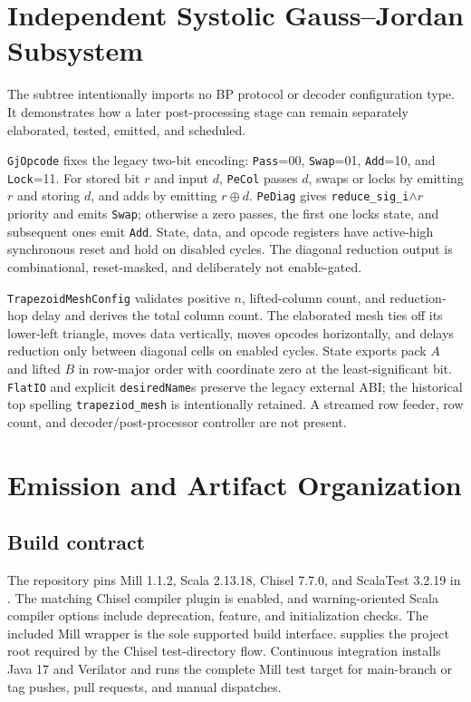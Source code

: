 \documentclass[10pt,conference]{IEEEtran}
\begin{document}
\section{Independent Systolic Gauss--Jordan Subsystem}
The  subtree intentionally imports no BP protocol or decoder
configuration type.  It demonstrates how a later post-processing stage can
remain separately elaborated, tested, emitted, and scheduled.

\texttt{GjOpcode} fixes the legacy two-bit encoding:
\texttt{Pass}=00, \texttt{Swap}=01, \texttt{Add}=10, and
\texttt{Lock}=11.  For stored bit $r$ and input $d$, \texttt{PeCol} passes $d$,
swaps or locks by emitting $r$ and storing $d$, and adds by emitting
$r\oplus d$.  \texttt{PeDiag} gives
\texttt{reduce\_sig\_i}$\land r$ priority and emits \texttt{Swap}; otherwise a
zero passes, the first one locks state, and subsequent ones emit
\texttt{Add}.  State, data, and opcode registers have active-high synchronous
reset and hold on disabled cycles.  The diagonal reduction output is
combinational, reset-masked, and deliberately not enable-gated.

\texttt{TrapezoidMeshConfig} validates positive $n$, lifted-column count, and
reduction-hop delay and derives the total column count.  The elaborated mesh
ties off its lower-left triangle, moves data vertically, moves opcodes
horizontally, and delays reduction only between diagonal cells on enabled
cycles.  State exports pack $A$ and lifted $B$ in row-major order with
coordinate zero at the least-significant bit.  \texttt{FlatIO} and explicit
\texttt{desiredName}s preserve the legacy external ABI; the historical top
spelling \texttt{trapeziod\_mesh} is intentionally retained.  A streamed row
feeder, row count, and decoder/post-processor controller are not present.

\section{Emission and Artifact Organization}
\subsection{Build contract}
The repository pins Mill 1.1.2, Scala 2.13.18, Chisel 7.7.0, and ScalaTest
3.2.19 in .  The matching Chisel compiler plugin is enabled,
and warning-oriented Scala compiler options include deprecation, feature, and
initialization checks.  The included Mill wrapper is the sole supported build
interface.   supplies the project root required by the
Chisel test-directory flow.  Continuous integration installs Java 17 and
Verilator and runs the complete Mill test target for main-branch or tag pushes,
pull requests, and manual dispatches.
\end{document}
